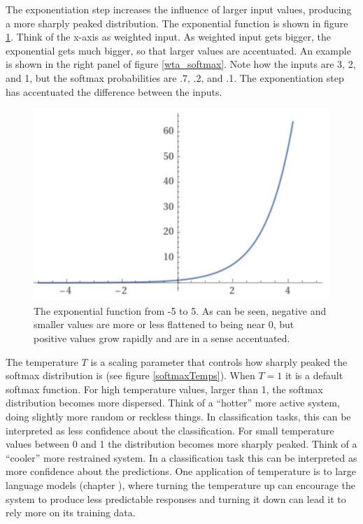 The exponentiation step increases the influence of larger input values, producing a more sharply peaked distribution. The exponential function is shown in figure \ref{exponentiation}. Think of the x-axis as weighted input. As weighted input gets bigger, the exponential gets much bigger, so that larger values are accentuated. An example is shown in the right panel of figure \ref{wta_softmax}. Note how the inputs are 3, 2, and 1, but the softmax probabilities are .7, .2, and .1. The exponentiation step has accentuated the difference between the inputs.

\begin{figure}[h]
\centering
\includegraphics[scale=.5]{./images/exponentialFunction.png}
\caption[Jeff Yoshimi using Wolfram Alpha.]{The exponential function from -5 to 5. As can be seen, negative and smaller values are more or less flattened to being near 0, but positive values grow rapidly and are in a sense accentuated.}
\label{exponentiation}
\end{figure}

The temperature $T$ is a scaling parameter that controls how sharply peaked the softmax distribution is (see figure \ref{softmaxTemps}). When $T=1$ it is a default softmax function.  For high temperature values, larger than 1, the softmax distribution becomes more dispersed. Think of a ``hotter'' more active system, doing slightly more random or reckless things. In classification tasks, this can be interpreted as less confidence about the classification.  For small temperature values between 0 and 1 the distribution becomes more sharply peaked. Think of a ``cooler'' more restrained system. In a classification task this can be interpreted as more confidence about the predictions.  One application of temperature is to large language models (chapter ), where turning the temperature up can encourage the system to produce less predictable responses and turning it down can lead it to rely more on its training data.

